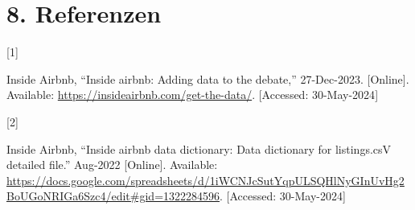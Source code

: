 \documentclass[
  journal,
]{IEEEtran}%
\newlength{\cslhangindent}
\newlength{\csllabelwidth}
\newlength{\cslentryspacingunit} %
\newenvironment{CSLReferences}[2] %
 {%
  \setlength{\parindent}{0pt}
  \ifodd #1
  \let\oldpar\par
  \def\par{\hangindent=\cslhangindent\oldpar}
  \fi
  \setlength{\parskip}{#2\cslentryspacingunit}
 }%
 {}
\newcommand{\CSLLeftMargin}[1]{\parbox[t]{\csllabelwidth}{#1}}
\newcommand{\CSLRightInline}[1]{\parbox[t]{\linewidth - \csllabelwidth}{#1}\break}
\providecommand{\bibfont}{\footnotesize}
\begin{document}
\hypertarget{referenzen}{%
\section*{8. Referenzen}\label{referenzen}}

\hypertarget{refs}{}
\begin{CSLReferences}{0}{0}
\leavevmode{}%
\CSLLeftMargin{{[}1{]} }%
\CSLRightInline{Inside Airbnb, {``Inside airbnb: Adding data to the
debate,''} 27-Dec-2023. {[}Online{]}. Available:
\url{https://insideairbnb.com/get-the-data/}. {[}Accessed:
30-May-2024{]}}

\leavevmode{}%
\CSLLeftMargin{{[}2{]} }%
\CSLRightInline{Inside Airbnb, {``Inside airbnb data dictionary: Data
dictionary for listings.csV detailed file.''} Aug-2022 {[}Online{]}.
Available:
\url{https://docs.google.com/spreadsheets/d/1iWCNJcSutYqpULSQHlNyGInUvHg2BoUGoNRIGa6Szc4/edit\#gid=1322284596}.
{[}Accessed: 30-May-2024{]}}

\end{CSLReferences}


\ifCLASSOPTIONcaptionsoff
  \newpage
\fi



\pagebreak[3]
\end{document}
